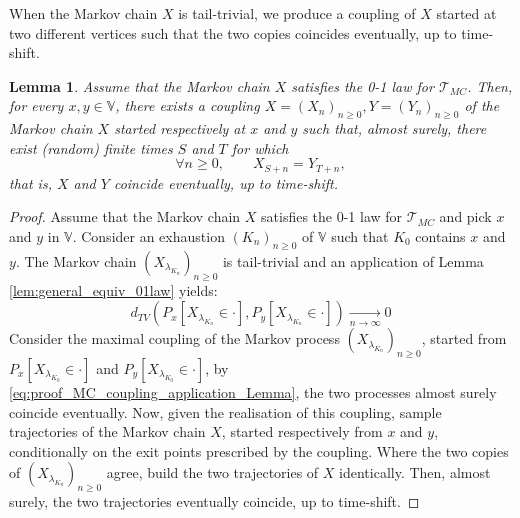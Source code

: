 \documentclass[12pt,a4paper]{article}
\newtheorem{lemma}[theo]{Lemma}
\newcommand{\1}[1]{{\mathbf 1}{\{#1\}}}
\newcommand{\8}{{\infty}}
\begin{document}
When the Markov chain $X$ is tail-trivial, we produce a coupling of $X$ started at two different vertices such that the two copies coincides eventually, up to time-shift.

\begin{lemma}\label{lem:equiv_conditions_01_MC}
  Assume that the Markov chain $X$ satisfies the 0-1 law for $\mathcal{T}_{MC}$. Then, for every $x, y\in \mathbb{V}$, there exists a coupling $X=(X_n)_{n\ge 0} , Y=(Y_n)_{n\ge 0}$ of the Markov chain $X$ started respectively at $x$ and $y$ such that, almost surely, there exist (random) finite times $S$ and $T$ for which
  \begin{equation}
    \forall n\ge 0 , \qquad  X_{S+n}=Y_{T+n}, 
  \end{equation} 
  that is, $X$ and $Y$ coincide eventually, up to time-shift. 
\end{lemma}

\begin{proof}
  Assume that the Markov chain $X$ satisfies the 0-1 law for $\mathcal{T}_{MC}$ and pick $x$ and $y$ in $\mathbb{V}$. 
  Consider an exhaustion $(K_n)_{n\ge 0}$ of $\mathbb{V}$ such that $K_0$ contains $x$ and $y$. 
  The Markov chain $(X_{\lambda_{K_n}})_{n\ge 0}$ is tail-trivial and an application of Lemma \ref{lem:general_equiv_01law} yields:
  \begin{equation}\label{eq:proof_MC_coupling_application_Lemma}
  d_{TV}(P_x[X_{\lambda_{K_n}} \in \cdot], P_y[X_{\lambda_{K_n}} \in \cdot]) \underset{n\to  \infty}\longrightarrow 0
  \end{equation}
  Consider the maximal coupling of the Markov process $(X_{\lambda_{K_n}})_{n\ge 0}$, started from $P_x[X_{\lambda_{K_0}}\in \cdot ]$ and $P_y[X_{\lambda_{K_0}}\in \cdot ]$, by \eqref{eq:proof_MC_coupling_application_Lemma}, the two processes almost surely coincide eventually. Now, given the realisation of this coupling, sample trajectories of the Markov chain $X$, started respectively from $x$ and $y$, conditionally on the exit points prescribed by the coupling. Where the two copies of $(X_{\lambda_{K_n}})_{n\ge 0}$ agree, build the two trajectories of $X$ identically. Then, almost surely, the two trajectories eventually coincide, up to time-shift.
\end{proof}
\end{document}
